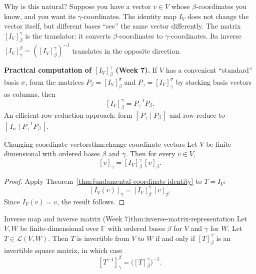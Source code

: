 Why is this natural? Suppose you have a vector $v\in V$ whose $\beta$-coordinates you know, and you want its $\gamma$-coordinates.
The identity map $I_V$ does not change the vector itself, but different bases ``see'' the same vector differently.
The matrix $[I_V]^{\gamma}_{\beta}$ is the translator: it converts $\beta$-coordinates to $\gamma$-coordinates.
Its inverse $[I_V]^{\beta}_{\gamma}=([I_V]^{\gamma}_{\beta})^{-1}$ translates in the opposite direction.

\begin{examtip}
\textbf{Practical computation of $[I_V]^{\gamma}_{\beta}$ (Week 7).}
If $V$ has a convenient ``standard'' basis $\sigma$, form the matrices $P_\beta=[I_V]^{\sigma}_{\beta}$ and $P_\gamma=[I_V]^{\sigma}_{\gamma}$ by stacking basis vectors as columns, then
\[
[I_V]^{\gamma}_{\beta}=P_\gamma^{-1}P_\beta.
\]
An efficient row-reduction approach: form $[\,P_\gamma\mid P_\beta\,]$ and row-reduce to $[\,I_n\mid P_\gamma^{-1}P_\beta\,]$.
\end{examtip}

\begin{theorem}{Changing coordinate vectors}{thm:change-coordinate-vectors}
Let $V$ be finite-dimensional with ordered bases $\beta$ and $\gamma$.
Then for every $v\in V$,
\[
[v]_\gamma = [I_V]^{\gamma}_{\beta}\,[v]_\beta.
\]
\end{theorem}

\begin{proof}
Apply Theorem~\ref{thm:fundamental-coordinate-identity} to $T=I_V$:
\[
[I_V(v)]_\gamma = [I_V]^{\gamma}_{\beta}\,[v]_\beta.
\]
Since $I_V(v)=v$, the result follows.
\end{proof}

\begin{theorem}{Inverse map and inverse matrix (Week 7)}{thm:inverse-matrix-representation}
Let $V,W$ be finite-dimensional over $\mathbb{F}$ with ordered bases $\beta$ for $V$ and $\gamma$ for $W$.
Let $T\in\mathcal{L}(V,W)$. Then $T$ is invertible from $V$ to $W$ if and only if $[T]^{\gamma}_{\beta}$ is an invertible square matrix,
in which case
\[
[T^{-1}]^{\beta}_{\gamma}=\bigl([T]^{\gamma}_{\beta}\bigr)^{-1}.
\]
\end{theorem}

